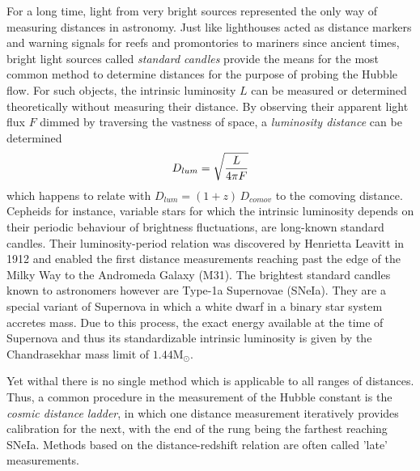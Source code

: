 For a long time, light from very bright sources represented the only way of
measuring distances in astronomy.  Just like lighthouses acted as
distance markers and warning signals for reefs and promontories to mariners
since ancient times, bright light sources called \textit{standard candles}
provide the means for the most common method to determine distances for the
purpose of probing the Hubble flow.  For such objects, the intrinsic luminosity
$L$ can be measured or determined theoretically without measuring their
distance.  By observing their apparent light flux $F$ dimmed by traversing the
vastness of space, a \textit{luminosity distance} can be determined
%
\begin{equation}\eqlbl{d_lum}%
    D_{lum} = \sqrt{\frac{L}{4\pi F}}
\end{equation}%
%
which happens to relate with $D_{lum}={(1+z)\,D_{comov}}$ to the comoving
distance.  Cepheids for instance, variable stars for which the intrinsic
luminosity depends on their periodic behaviour of brightness fluctuations, are
long-known standard candles.  Their luminosity-period relation was discovered by
Henrietta Leavitt in 1912 and enabled the first distance measurements reaching
past the edge of the Milky Way to the Andromeda Galaxy (M31).  The brightest
standard candles known to astronomers however are Type-1a Supernovae (SNeIa).
They are a special variant of Supernova in which a white dwarf in a binary star
system accretes mass.  Due to this process, the exact energy available at the
time of Supernova and thus its standardizable intrinsic luminosity is given by
the Chandrasekhar mass limit of $1.44\mathrm{M_\odot}$.  

Yet withal there is no single method which is applicable to all ranges of
distances.  Thus, a common procedure in the measurement of the Hubble constant
is the \textit{cosmic distance ladder}, in which one distance measurement
iteratively provides calibration for the next, with the end of the rung being
the farthest reaching SNeIa.  Methods based on the distance-redshift relation
are often called 'late' measurements.


